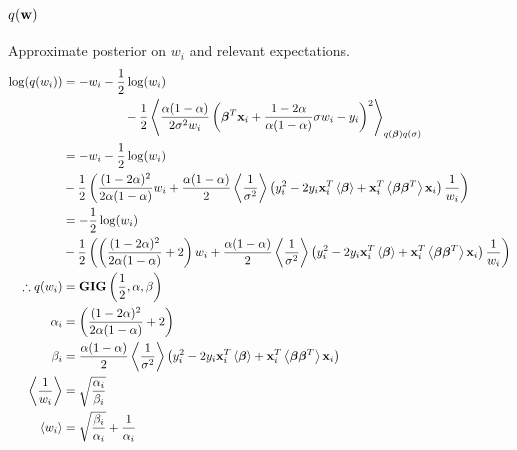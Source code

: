 \begin{appendices}
\subsection{ $q(\mathbf{w})$}
Approximate posterior on $w_i$ and relevant expectations.
\begin{align}
\nonumber
\log (q(w_i))&=-w_i-\frac{1}{2}\log(w_i)\\
\nonumber
&\qquad\qquad\quad-\frac{1}{2}\left\langle\frac{\alpha(1-\alpha)}{2\sigma^2 w_i}\left(\bm{\beta}^T \mathbf{x}_i+\frac{1-2\alpha}{\alpha(1-\alpha)}\sigma w_i-y_i\right)^2\right\rangle_{q(\bm{\beta})q(\sigma)}\\
\nonumber
&=-w_i-\frac{1}{2}\log(w_i)\\
\nonumber&-\frac{1}{2}\left(\frac{(1-2\alpha)^2}{2\alpha(1-\alpha)}w_i+\frac{\alpha(1-\alpha)}{2}\left\langle\frac{1}{\sigma^2}\right\rangle\left(y_i^2-2y_i\mathbf{x}_i^T\left\langle\bm{\beta}\right\rangle+\mathbf{x}_i^T\left\langle\bm{\beta}\bm{\beta}^T\right\rangle\mathbf{x}_i\right)\frac{1}{w_i}\right)\\
\nonumber
&=-\frac{1}{2}\log(w_i)\\
\nonumber&-\frac{1}{2}\left(\left(\frac{(1-2\alpha)^2}{2\alpha(1-\alpha)}+2\right)w_i+\frac{\alpha(1-\alpha)}{2}\left\langle\frac{1}{\sigma^2}\right\rangle\left(y_i^2-2y_i\mathbf{x}_i^T\left\langle\bm{\beta}\right\rangle+\mathbf{x}_i^T\left\langle\bm{\beta}\bm{\beta}^T\right\rangle\mathbf{x}_i\right)\frac{1}{w_i}\right)\\
\therefore q(w_i) & = \mathbf{GIG}\left(\frac{1}{2},\alpha,\beta\right)\\
\alpha_i & =\left(\frac{(1-2\alpha)^2}{2\alpha(1-\alpha)}+2\right) \\
\beta_i & = \frac{\alpha(1-\alpha)}{2}\left\langle\frac{1}{\sigma^2}\right\rangle\left(y_i^2-2y_i\mathbf{x}_i^T\left\langle\bm{\beta}\right\rangle+\mathbf{x}_i^T\left\langle\bm{\beta}\bm{\beta}^T\right\rangle\mathbf{x}_i\right)\\
\left\langle\frac{1}{w_i}\right\rangle&=\sqrt{\frac{\alpha_i}{\beta_i}}\\
\left\langle w_i\right\rangle&=\sqrt{\frac{\beta_i}{\alpha_i}}+\frac{1}{\alpha_i}
\end{align}


\end{appendices}
